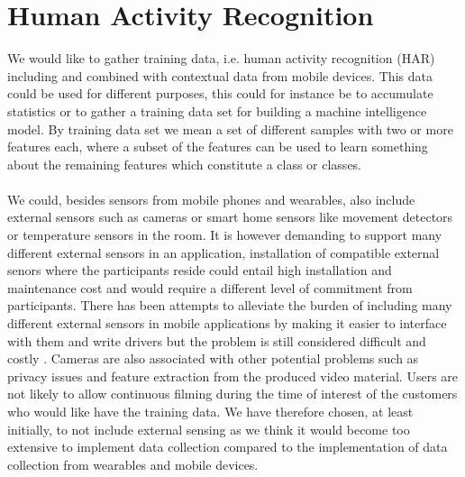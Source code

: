 
\section{Human Activity Recognition}
\label{sec:human_activity_recognition}

We would like to gather training data, i.e. human activity recognition (HAR) including and combined with contextual data from mobile devices. This data could be used for different purposes, this could for instance be to accumulate statistics or to gather a training data set for building a machine intelligence model. By training data set we mean a set of different samples with two or more features each, where a subset of the features can be used to learn something about the remaining features which constitute a class or classes.
\\\\
We could, besides sensors from mobile phones and wearables, also include external sensors such as cameras or smart home sensors like movement detectors or temperature sensors in the room. It is however demanding to support many different external sensors in an application, installation of compatible external senors where the participants reside could entail high installation and maintenance cost and would require a different level of commitment from participants. There has been attempts to alleviate the burden of including many different external sensors in mobile applications by making it easier to interface with them and write drivers but the problem is still considered difficult and costly \parencite{open_data_kit}. Cameras are also associated with other potential problems such as privacy issues and feature extraction from the produced video material. Users are not likely to allow continuous filming during the time of interest of the customers who would like have the training data. We have therefore chosen, at least initially, to not include external sensing as we think it would become too extensive to implement data collection compared to the implementation of data collection from wearables and mobile devices.
\\\\
